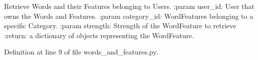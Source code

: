 \begin{DoxyVerb}Retrieve Words and their Features belonging to Users.
:param user_id: User that owns the Words and Features.
:param category_id: WordFeatures belonging to a specific Category.
:param strength: Strength of the WordFeature to retrieve
:return: a dictionary of objects representing the WordFeature.
\end{DoxyVerb}
 

Definition at line 9 of file words\+\_\+and\+\_\+features.\+py.

